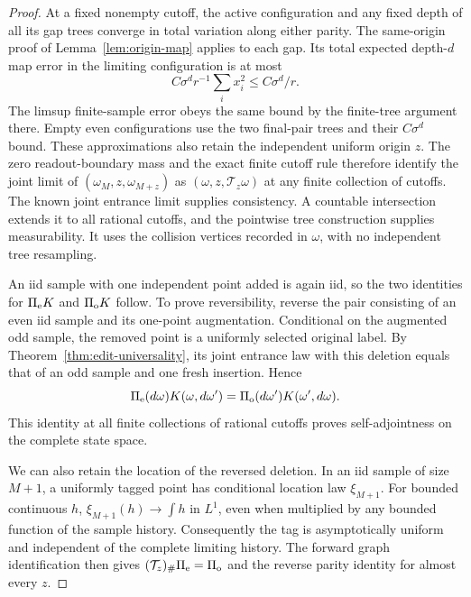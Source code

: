 \documentclass[11pt,letterpaper]{article}
\begin{document}
\begin{proof}
At a fixed nonempty cutoff, the active configuration and any fixed
depth of all its gap trees converge in total variation along either
parity. The same-origin proof of Lemma~\ref{lem:origin-map} applies
to each gap. Its total expected depth-$d$ map error in the limiting
configuration is at most
\[
 C\sigma^d r^{-1}\sum_i x_i^2\le C\sigma^d/r.
\]
The limsup finite-sample error obeys the same bound by the finite-tree
argument there. Empty even configurations use the two final-pair
trees and their $C\sigma^d$ bound. These approximations also retain
the independent uniform origin $z$. The zero readout-boundary mass
and the exact finite cutoff rule therefore identify the joint limit
of $(\omega_M,z,\omega_{M+z})$ as
$(\omega,z,\mathcal T_z\omega)$ at any finite collection of cutoffs.
The known joint entrance limit supplies consistency. A countable
intersection extends it to all rational cutoffs, and the pointwise
tree construction supplies measurability. It uses the collision
vertices recorded in $\omega$, with no independent tree resampling.

An iid sample with one independent point added is again iid, so the
two identities for $\Pi_{\rm e}K$ and $\Pi_{\rm o}K$ follow.
To prove reversibility, reverse the pair consisting of an even iid
sample and its one-point augmentation. Conditional on the augmented
odd sample, the removed point is a uniformly selected original
label. By Theorem~\ref{thm:edit-universality}, its joint entrance law
with this deletion equals that of an odd sample and one fresh
insertion. Hence
\[
 \Pi_{\rm e}(d\omega)K(\omega,d\omega')
   =\Pi_{\rm o}(d\omega')K(\omega',d\omega).
\]
This identity at all finite collections of rational cutoffs proves
self-adjointness on the complete state space.

We can also retain the location of the reversed deletion. In an iid
sample of size $M+1$, a uniformly tagged point has conditional location
law $\xi_{M+1}$. For bounded continuous $h$,
$\xi_{M+1}(h)\to\int h$ in $L^1$, even when multiplied by any bounded
function of the sample history. Consequently the tag is asymptotically
uniform and independent of the complete limiting history. The
forward graph identification then gives
$(\mathcal T_z)_\#\Pi_{\rm e}=\Pi_{\rm o}$ and the reverse parity
identity for almost every $z$.


\end{proof}
\end{document}

